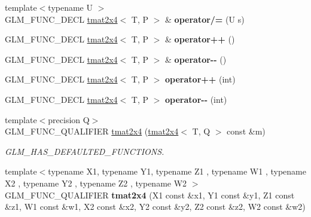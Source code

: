 \begin{DoxyCompactItemize}
\item 
\hypertarget{structglm_1_1tmat2x4_aa979764dc4e9915169cec5dd81b55b31}{{\footnotesize template$<$typename U $>$ }\\G\-L\-M\-\_\-\-F\-U\-N\-C\-\_\-\-D\-E\-C\-L \hyperlink{structglm_1_1tmat2x4}{tmat2x4}$<$ T, P $>$ \& {\bfseries operator/=} (U s)}\label{structglm_1_1tmat2x4_aa979764dc4e9915169cec5dd81b55b31}

\item 
\hypertarget{structglm_1_1tmat2x4_a3cee5fba0b07ed5708aeea6b2d6fcf46}{G\-L\-M\-\_\-\-F\-U\-N\-C\-\_\-\-D\-E\-C\-L \hyperlink{structglm_1_1tmat2x4}{tmat2x4}$<$ T, P $>$ \& {\bfseries operator++} ()}\label{structglm_1_1tmat2x4_a3cee5fba0b07ed5708aeea6b2d6fcf46}

\item 
\hypertarget{structglm_1_1tmat2x4_aafc4d25fe4f906a6e8ef4b7f90f7ff43}{G\-L\-M\-\_\-\-F\-U\-N\-C\-\_\-\-D\-E\-C\-L \hyperlink{structglm_1_1tmat2x4}{tmat2x4}$<$ T, P $>$ \& {\bfseries operator-\/-\/} ()}\label{structglm_1_1tmat2x4_aafc4d25fe4f906a6e8ef4b7f90f7ff43}

\item 
\hypertarget{structglm_1_1tmat2x4_a721945e0fb3653040ed9b68a65288a6c}{G\-L\-M\-\_\-\-F\-U\-N\-C\-\_\-\-D\-E\-C\-L \hyperlink{structglm_1_1tmat2x4}{tmat2x4}$<$ T, P $>$ {\bfseries operator++} (int)}\label{structglm_1_1tmat2x4_a721945e0fb3653040ed9b68a65288a6c}

\item 
\hypertarget{structglm_1_1tmat2x4_ac1f8d36996a11d5fcf0d1ff29b254ba6}{G\-L\-M\-\_\-\-F\-U\-N\-C\-\_\-\-D\-E\-C\-L \hyperlink{structglm_1_1tmat2x4}{tmat2x4}$<$ T, P $>$ {\bfseries operator-\/-\/} (int)}\label{structglm_1_1tmat2x4_ac1f8d36996a11d5fcf0d1ff29b254ba6}

\item 
\hypertarget{structglm_1_1tmat2x4_a8f8c262382e497559d75eed475deaa49}{{\footnotesize template$<$precision Q$>$ }\\G\-L\-M\-\_\-\-F\-U\-N\-C\-\_\-\-Q\-U\-A\-L\-I\-F\-I\-E\-R \hyperlink{structglm_1_1tmat2x4_a8f8c262382e497559d75eed475deaa49}{tmat2x4} (\hyperlink{structglm_1_1tmat2x4}{tmat2x4}$<$ T, Q $>$ const \&m)}\label{structglm_1_1tmat2x4_a8f8c262382e497559d75eed475deaa49}

\begin{DoxyCompactList}\small\item\em G\-L\-M\-\_\-\-H\-A\-S\-\_\-\-D\-E\-F\-A\-U\-L\-T\-E\-D\-\_\-\-F\-U\-N\-C\-T\-I\-O\-N\-S. \end{DoxyCompactList}\item 
\hypertarget{structglm_1_1tmat2x4_a68e6bfbd6022bcddfbaf66ba2a6e027e}{{\footnotesize template$<$typename X1, typename Y1, typename Z1 , typename W1 , typename X2 , typename Y2 , typename Z2 , typename W2 $>$ }\\G\-L\-M\-\_\-\-F\-U\-N\-C\-\_\-\-Q\-U\-A\-L\-I\-F\-I\-E\-R {\bfseries tmat2x4} (X1 const \&x1, Y1 const \&y1, Z1 const \&z1, W1 const \&w1, X2 const \&x2, Y2 const \&y2, Z2 const \&z2, W2 const \&w2)}\label{structglm_1_1tmat2x4_a68e6bfbd6022bcddfbaf66ba2a6e027e}


\end{DoxyCompactItemize}
